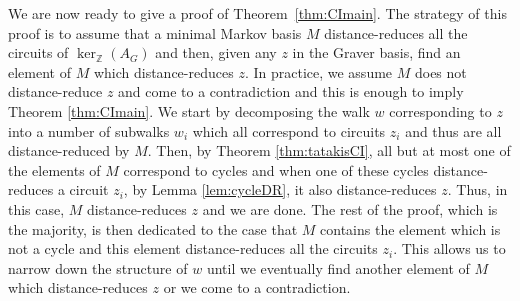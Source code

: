\documentclass[a4paper, 12pt]{article}
\newcommand{\ZZ}{\mathbb Z}
\theoremstyle{plain}
\theoremstyle{definition}
\theoremstyle{remark}
\begin{document}
We are now ready to give a proof of Theorem~\ref{thm:CImain}. The strategy of this proof is to assume that a minimal Markov basis $M$ distance-reduces all the circuits of $\ker_\ZZ(A_G)$ and then, given any $z$ in the Graver basis, find an element of $M$ which distance-reduces $z$. In practice, we assume $M$ does not distance-reduce $z$ and come to a contradiction and this is enough to imply Theorem \ref{thm:CImain}. We start by decomposing the walk $w$ corresponding to $z$ into a number of subwalks $w_i$ which all correspond to circuits $z_i$ and thus are all distance-reduced by $M$. Then, by Theorem \ref{thm:tatakisCI}, all but at most one of the elements of $M$ correspond to cycles and when one of these cycles distance-reduces a circuit $z_i$, by Lemma \ref{lem:cycleDR}, it also distance-reduces $z$. Thus, in this case, $M$ distance-reduces $z$ and we are done. The rest of the proof, which is the majority, is then dedicated to the case that $M$ contains the element which is not a cycle and this element distance-reduces all the circuits $z_i$. This allows us to narrow down the structure of $w$ until we eventually find another element of $M$ which distance-reduces $z$ or we come to a contradiction.
\end{document}
